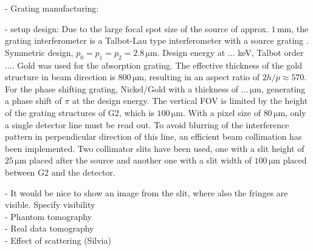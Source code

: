 \documentclass[aps,prl,floatfix,twocolumn,10pt]{revtex4-1}  %
\newcommand{\unit}[1]{\ensuremath{\, \mathrm{#1}}}
\begin{document}
- Grating manufacturing: 

- setup design: Due to the large focal spot size of the source of approx. $1 \unit{mm}$, the grating interferometer is a Talbot-Lau type interferometer with a source grating \cite{Pfeiffer2006}. Symmetric design, $p_0 = p_1 = p_2 = 2.8 \unit{\mu m}$. Design energy at ... keV, Talbot order .... Gold was used for the absorption grating. The effective thickness of the gold structure in beam direction is $800 \unit{\mu m}$, resulting in an aspect ratio of $2h/p \approx 570$. For the phase shifting grating, Nickel/Gold with a thickness of $... \unit{\mu m}$, generating a phase shift of $\pi$ at the design energy. The vertical FOV is limited by the height of the grating structures of G2, which is $100 \unit{\mu m}$. With a pixel size of $80 \unit{\mu m}$, only a single detector line must be read out. To avoid blurring of the interference pattern in perpendicular direction of this line, an efficient beam collimation has been implemented. Two collimator slits have been used, one with a slit height of $25 \unit{\mu m}$ placed after the source and another one with a slit width of $100 \unit{\mu m}$ placed between G2 and the detector.


- It would be nice to show an image from the slit, where also the fringes are visible. Specify visibility \\
- Phantom tomography \\
- Real data tomography \\
- Effect of scattering (Silvia) \\









\end{document}
